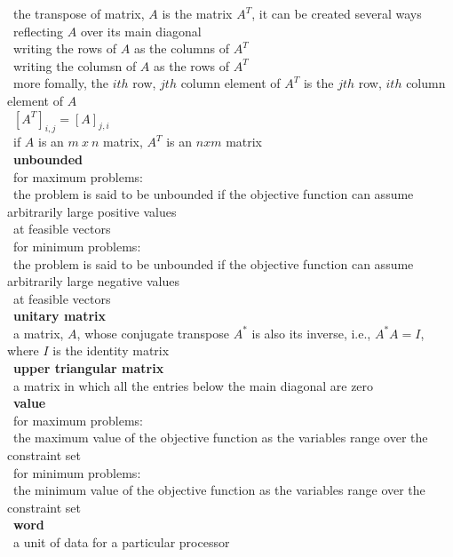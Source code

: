 \documentclass[10pt,letterpaper]{scrartcl}
\newcommand{\tbul}{\textbullet}
\newcommand{\tend}{\>\textendash}
\newcommand{\tasc}{\>\>\textasteriskcentered}
\newcommand{\tpec}{\>\>\>\textperiodcentered}
\begin{document}
\begin{tabbing}
    \tend\ the transpose of matrix, $A$ is the matrix $A^T$, it can be created several ways \\
        \tasc\ reflecting $A$ over its main diagonal \\
        \tasc\ writing the rows of $A$ as the columns of $A^T$ \\
        \tasc\ writing the columsn of $A$ as the rows of $A^T$ \\
        \tasc\ more fomally, the $ith$ row, $jth$ column element of $A^T$ is the $jth$ row, $ith$ column element of $A$ \\
            \tpec\ $[A^T]_{i,j} = [A]_{j,i}$ \\
        \tasc\ if $A$ is an $m\ x\ n$ matrix, $A^T$ is an $nxm$ matrix \\
\tbul\ \textbf{unbounded} \\
    \tend\ for maximum problems: \\
        \tasc\ the problem is said to be unbounded if the objective function can assume arbitrarily large positive values \\ \>\>\ at feasible vectors \\
    \tend\ for minimum problems: \\
        \tasc\ the problem is said to be unbounded if the objective function can assume arbitrarily large negative values \\ \>\>\ at feasible vectors \\
\tbul\ \textbf{unitary matrix} \\
    \tend\ a matrix, $A$, whose conjugate transpose $A^*$ is also its inverse, i.e., $A^*A=I$, where $I$ is the identity matrix \\
\tbul\ \textbf{upper triangular matrix} \\
    \tend\ a matrix in which all the entries below the main diagonal are zero \\
\tbul\ \textbf{value} \\
    \tend\ for maximum problems: \\ 
        \tasc\ the maximum value of the objective function as the variables range over the constraint set \\
    \tend\ for minimum problems: \\
        \tasc\ the minimum value of the objective function as the variables range over the constraint set \\
\tbul\ \textbf{word} \\
    \tend\ a unit of data for a particular processor \\

\end{tabbing}
\end{document}
